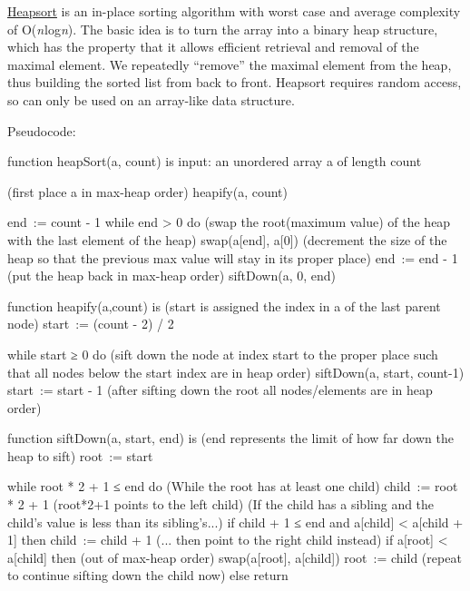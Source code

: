 \begin{itemize}
\href{http://en.wikipedia.org/wiki/Heapsort}{Heapsort} is an in-place
sorting algorithm with worst case and average complexity of
O(\emph{n} log\emph{n}). The basic idea is to turn the array into a
binary heap structure, which has the property that it allows efficient
retrieval and removal of the maximal element. We repeatedly ``remove''
the maximal element from the heap, thus building the sorted list from
back to front. Heapsort requires random access, so can only be used on
an array-like data structure.

Pseudocode:

\begin{wideverbatim}
function heapSort(a, count) is
   input: an unordered array a of length count
 
   (first place a in max-heap order)
   heapify(a, count)
 
   end := count - 1
   while end > 0 do
      (swap the root(maximum value) of the heap with the
       last element of the heap)
      swap(a[end], a[0])
      (decrement the size of the heap so that the previous
       max value will stay in its proper place)
      end := end - 1
      (put the heap back in max-heap order)
      siftDown(a, 0, end)
\end{wideverbatim}

\begin{wideverbatim}
function heapify(a,count) is
   (start is assigned the index in a of the last parent node)
   start := (count - 2) / 2
   
   while start ≥ 0 do
      (sift down the node at index start to the proper place
       such that all nodes below the start index are in heap
       order)
      siftDown(a, start, count-1)
      start := start - 1
   (after sifting down the root all nodes/elements are in heap order)
 
function siftDown(a, start, end) is
   (end represents the limit of how far down the heap to sift)
   root := start

   while root * 2 + 1 ≤ end do       (While the root has at least one child)
      child := root * 2 + 1           (root*2+1 points to the left child)
      (If the child has a sibling and the child's value is less than its sibling's...)
      if child + 1 ≤ end and a[child] < a[child + 1] then
         child := child + 1           (... then point to the right child instead)
      if a[root] < a[child] then     (out of max-heap order)
         swap(a[root], a[child])
         root := child                (repeat to continue sifting down the child now)
      else
         return
\end{wideverbatim}


\end{itemize}
